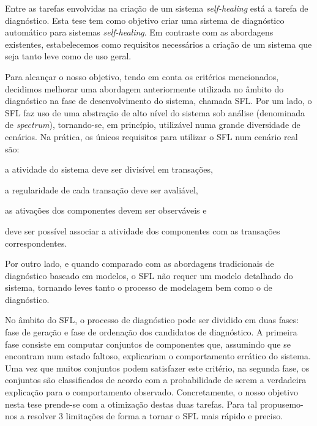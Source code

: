 Entre as tarefas envolvidas na criação de um sistema
\emph{self-healing} está a tarefa de diagnóstico.
%
Esta tese tem como objetivo criar uma sistema de diagnóstico
automático para sistemas \emph{self-healing}.
%
Em contraste com as abordagens existentes, estabelecemos como
requisitos necessários a criação de um sistema que seja tanto leve
como de uso geral.


Para alcançar o nosso objetivo, tendo em conta os critérios
mencionados, decidimos melhorar uma abordagem anteriormente utilizada
no âmbito do diagnóstico na fase de desenvolvimento do sistema,
chamada \ac{SFL}.
%
Por um lado, o \ac{SFL} faz uso de uma abstração de alto nível do
sistema sob análise (denominada de \emph{spectrum}), tornando-se, em
princípio, utilizável numa grande diversidade de cenários.
%
Na prática, os únicos requisitos para utilizar o \ac{SFL} num cenário
real são:
\begin{inparaenum}[(1)]
\item a atividade do sistema deve ser divisível em transações,
\item a regularidade de cada transação deve ser avaliável,
\item as ativações dos componentes devem ser observáveis e
\item deve ser possível associar a atividade dos componentes com as
  transações correspondentes.
\end {inparaenum}
%
Por outro lado, e quando comparado com as abordagens tradicionais de
diagnóstico baseado em modelos, o \ac{SFL} não requer um modelo
detalhado do sistema, tornando leves tanto o processo de modelagem bem
como o de diagnóstico.
%


No âmbito do \ac{SFL}, o processo de diagnóstico pode ser dividido em
duas fases: fase de geração e fase de ordenação dos candidatos de
diagnóstico.
%
A primeira fase consiste em computar conjuntos de componentes que,
assumindo que se encontram num estado faltoso, explicariam o
comportamento errático do sistema.
%
Uma vez que muitos conjuntos podem satisfazer este critério, na
segunda fase, os conjuntos são classificados de acordo com a
probabilidade de serem a verdadeira explicação para o comportamento
observado.
%
Concretamente, o nosso objetivo nesta tese prende-se com a otimização
destas duas tarefas.
%
Para tal propusemo-nos a resolver $3$ limitações de forma a tornar o
\ac{SFL} mais rápido e preciso.


